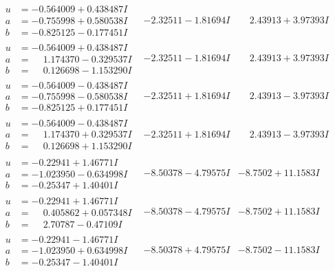 \documentclass[1p]{elsarticle_modified}
\theoremstyle{definition}
\begin{document}
$$\begin{array}{c|c|c}
\begin{aligned}
u &= -0.564009 + 0.438487 I \\
a &= -0.755998 + 0.580538 I \\
b &= -0.825125 - 0.177451 I\end{aligned}
 & -2.32511 - 1.81694 I & \phantom{-}2.43913 + 3.97393 I \\ \hline\begin{aligned}
u &= -0.564009 + 0.438487 I \\
a &= \phantom{-}1.174370 - 0.329537 I \\
b &= \phantom{-}0.126698 - 1.153290 I\end{aligned}
 & -2.32511 - 1.81694 I & \phantom{-}2.43913 + 3.97393 I \\ \hline\begin{aligned}
u &= -0.564009 - 0.438487 I \\
a &= -0.755998 - 0.580538 I \\
b &= -0.825125 + 0.177451 I\end{aligned}
 & -2.32511 + 1.81694 I & \phantom{-}2.43913 - 3.97393 I \\ \hline\begin{aligned}
u &= -0.564009 - 0.438487 I \\
a &= \phantom{-}1.174370 + 0.329537 I \\
b &= \phantom{-}0.126698 + 1.153290 I\end{aligned}
 & -2.32511 + 1.81694 I & \phantom{-}2.43913 - 3.97393 I \\ \hline\begin{aligned}
u &= -0.22941 + 1.46771 I \\
a &= -1.023950 - 0.634998 I \\
b &= -0.25347 + 1.40401 I\end{aligned}
 & -8.50378 - 4.79575 I & -8.7502 + 11.1583 I \\ \hline\begin{aligned}
u &= -0.22941 + 1.46771 I \\
a &= \phantom{-}0.405862 + 0.057348 I \\
b &= \phantom{-}2.70787 - 0.47109 I\end{aligned}
 & -8.50378 - 4.79575 I & -8.7502 + 11.1583 I \\ \hline\begin{aligned}
u &= -0.22941 - 1.46771 I \\
a &= -1.023950 + 0.634998 I \\
b &= -0.25347 - 1.40401 I\end{aligned}
 & -8.50378 + 4.79575 I & -8.7502 - 11.1583 I \\ \hline\begin{aligned}

\end{aligned}
\end{array}$$
\end{document}
